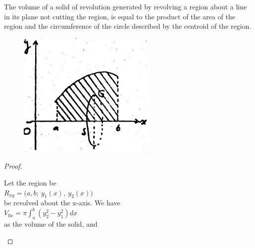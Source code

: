 \documentclass[9pt]{amsbook}
\begin{document}
\begin{thm}
		The volume of a solid of revolution generated
	by revolving a region about a line in its plane not cutting the 
	region, is equal to the product of the area of the region and 
	the circumference of the circle described by the centroid of 
	the region.
\end{thm}
\begin{figure}
	\includegraphics{images/b1p2-501-fig02.png}
\end{figure}
\begin{proof}
\begin{flushleft}
	{
		Let the region be \\
		$ R_{xy} = \Bigg(a, b;\ y_1(x),\ y_2(x)\Bigg)$  \\
		be revolved about the x-axis. We have \\
		$V_{0x} = \pi \int_{a}^{b} (y_2^2-y_1^2) dx$ \\
		as the volume of the solid, and \\
	}
\end{flushleft}
\end{proof}








\end{document}
